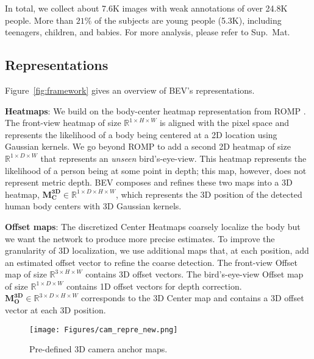 \documentclass[10pt,twocolumn,letterpaper]{article}
\begin{document}
In total, we collect about 7.6K images with weak annotations of over 24.8K people.
More than $21\%$ of the subjects are young people (5.3K), including teenagers, children, and babies.
For more analysis, please refer to Sup.~Mat.

\subsection{Representations}\label{sec:representations}
\noindent Figure~\ref{fig:framework} gives an overview of BEV's representations.


\textbf{Heatmaps}:
We build on the body-center heatmap representation from ROMP \cite{romp}.
The front-view heatmap of size $\mathbb{R}^{1 \times H \times W}$ is aligned with the pixel space and represents the likelihood of a body being centered at a 2D location using Gaussian kernels.
We go beyond ROMP to add a second 2D heatmap of size $\mathbb{R}^{1 \times D \times W}$ that represents an {\em unseen} bird's-eye-view.
This heatmap represents the likelihood of a person being at some point in depth; this map, however, does not represent metric depth.
BEV composes and refines these two maps into a 3D heatmap, $\boldsymbol{M_C^{3D}} \in  \mathbb{R}^{1\times D \times H \times W}$, which represents the 3D position of the detected human body centers with 3D Gaussian kernels.




\textbf{Offset maps}:
The discretized Center Heatmaps coarsely localize the body but we want the network to produce more precise estimates.
To improve the granularity of 3D localization, we use additional maps that, at each position, add an estimated offset vector to refine the coarse detection.
The front-view Offset map of size $\mathbb{R}^{3 \times H \times W}$ contains 3D offset vectors.
The bird's-eye-view Offset map of size $\mathbb{R}^{1 \times D \times W}$ contains 1D offset vectors for depth correction.
$\boldsymbol{M_O^{3D}} \in \mathbb{R}^{3 \times D \times H \times W}$ corresponds to the 3D Center map and contains a 3D offset vector at each 3D position.


\begin{figure}[t]
	\centerline{	\texttt{[image: Figures/cam\_repre\_new.png]}}
	\vspace{-0.1in}
	\caption{Pre-defined 3D camera anchor maps.}
	\label{fig:camera_anchors}\vspace{-3mm}
\end{figure}
\end{document}
